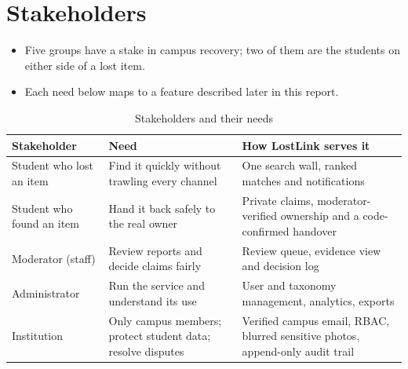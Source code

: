 \documentclass[12pt,a4paper,oneside]{report}
\begin{document}
\section{Stakeholders}
\begin{itemize}
  \item Five groups have a stake in campus recovery; two of them are the students on either side of a lost item.
  \item Each need below maps to a feature described later in this report.
\end{itemize}
\begin{table}[H]
\centering\small
\caption{Stakeholders and their needs}
\begin{tabularx}{\textwidth}{P{30mm}X X}
\toprule
Stakeholder & Need & How LostLink serves it\\
\midrule
Student who lost an item & Find it quickly without trawling every channel & One search wall, ranked matches and notifications\\
Student who found an item & Hand it back safely to the real owner & Private claims, moderator-verified ownership and a code-confirmed handover\\
Moderator (staff) & Review reports and decide claims fairly & Review queue, evidence view and decision log\\
Administrator & Run the service and understand its use & User and taxonomy management, analytics, exports\\
Institution & Only campus members; protect student data; resolve disputes & Verified campus email, RBAC, blurred sensitive photos, append-only audit trail\\
\bottomrule
\end{tabularx}
\end{table}
\end{document}
